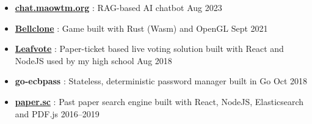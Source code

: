   \begin{itemize}
    \item \href{https://chat.maowtm.org}{\textbf{\color{link}chat.maowtm.org}} : RAG-based AI chatbot \dashdiv{} Aug 2023



    \item \href{https://bellclone.maowtm.org/}{\color{link}\textbf{Bellclone}} : Game built with Rust (Wasm) and OpenGL \dashdiv{} Sept 2021

    \item \href{https://leafvote.mww.moe}{\color{link}\textbf{Leafvote}} : Paper-ticket based live voting solution built with React and NodeJS used by my high school \dashdiv{} Aug 2018


    \item \textbf{go-ecbpass} : Stateless, deterministic password manager built in Go \dashdiv{} Oct 2018

    \item \href{https://paper.sc}{\color{link}\textbf{paper.sc}} : Past paper search engine built with React, NodeJS, Elasticsearch and PDF.js \dashdiv{} 2016--2019



  \end{itemize}


